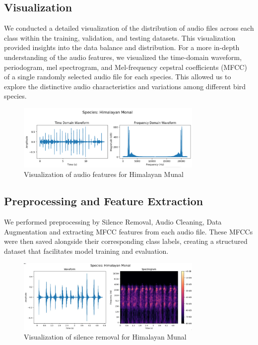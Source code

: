 \subsection{Visualization}
We conducted a detailed visualization of the distribution of audio files across each class within the training, validation, and testing datasets. This visualization provided insights into the data balance and distribution. For a more in-depth understanding of the audio features, we visualized the time-domain waveform, periodogram, mel spectrogram, and Mel-frequency cepstral coefficients (MFCC) of a single randomly selected audio file for each species. This allowed us to explore the distinctive audio characteristics and variations among different bird species.

\begin{figure}[h!]
    \centering
    \includegraphics[width=0.8\textwidth]{images/vis_himalayan_monal.png}
    \caption{Visualization of audio features for Himalayan Munal}
    \label{fig:visualization}
\end{figure}

\newpage

\subsection{Preprocessing and Feature Extraction}
We performed preprocessing by Silence Removal, Audio Cleaning, Data Augmentation and extracting MFCC features from each audio file. These MFCCs were then saved alongside their corresponding class labels, creating a structured dataset that facilitates model training and evaluation.

\begin{figure}[h!]
    \centering
    \includegraphics[width=0.8\textwidth]{images/silence_removal.jpg}
    \caption{Visualization of silence removal for Himalayan Munal}
    \label{fig:visualization}
\end{figure}

